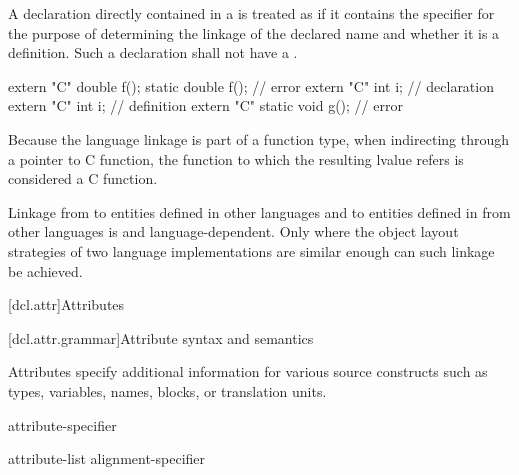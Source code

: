 \pnum
A declaration directly contained in a
is treated as if it contains the
specifier for the purpose of determining the linkage of the
declared name and whether it is a definition. Such a declaration shall
not have a .
\begin{example}
\begin{codeblock}
extern "C" double f();
static double f();                  // error
extern "C" int i;                   // declaration
extern "C" {
  int i;                            // definition
}
extern "C" static void g();         // error
\end{codeblock}
\end{example}

\pnum
\begin{note}
Because the language linkage is part of a function type, when
indirecting through a pointer to C function, the function to
which the resulting lvalue refers is considered a C function.
\end{note}

\pnum
{}%
%
Linkage from \Cpp{} to entities defined in other languages and to entities
defined in \Cpp{} from other languages is  and
language-dependent. Only where the object layout strategies of two
language implementations are similar enough can such linkage be
achieved.%

[dcl.attr]{Attributes}%

[dcl.attr.grammar]{Attribute syntax and semantics}

\pnum
{}%
Attributes specify additional information for various source constructs
such as types, variables, names, blocks, or translation units.

\begin{bnf}
\br
   attribute-specifier
\end{bnf}

\begin{bnf}
\br
  \terminal{[} \terminal{[}  attribute-list \terminal{]} \terminal{]}\br
  alignment-specifier
\end{bnf}

